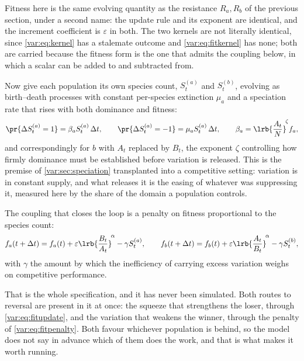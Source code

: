 Fitness here is the same evolving quantity as the resistance $R_a,R_b$ of
the previous section, under a second name: the update rule and its exponent
are identical, and the increment coefficient is $\varepsilon$ in both. The
two kernels are not literally identical, since \cref{var:eq:kernel} has a
stalemate outcome and \cref{var:eq:fitkernel} has none; both are carried
because the fitness form is the one that admits the coupling below, in which
a scalar can be added to and subtracted from.

Now give each population its own species count, $S^{(a)}_t$ and $S^{(b)}_t$,
evolving as birth--death processes with constant per-species extinction
$\mu_a$ and a speciation rate that rises with both dominance and fitness:
\begin{equation}
\pr{\Delta S^{(a)}_t=1}=\beta_a S^{(a)}_t\,\Delta t,
\qquad
\pr{\Delta S^{(a)}_t=-1}=\mu_a S^{(a)}_t\,\Delta t,
\qquad
\beta_a=\lrb{\frac{A_t}{N}}^{\!\zeta}f_a,
\label{var:eq:subspec}
\end{equation}
and correspondingly for $b$ with $A_t$ replaced by $B_t$, the exponent
$\zeta$ controlling how firmly dominance must be established before variation
is released. This is the premise of \cref{var:sec:speciation} transplanted
into a competitive setting: variation is in constant supply, and what
releases it is the easing of whatever was suppressing it, measured here by
the share of the domain a population controls.

The coupling that closes the loop is a penalty on fitness proportional to the
species count:
\begin{equation}
f_a(t+\Delta t)=f_a(t)+\varepsilon\lrb{\frac{B_t}{A_t}}^{\!\alpha}
-\gamma S^{(a)}_t,
\qquad
f_b(t+\Delta t)=f_b(t)+\varepsilon\lrb{\frac{A_t}{B_t}}^{\!\alpha}
-\gamma S^{(b)}_t,
\label{var:eq:fitpenalty}
\end{equation}
with $\gamma$ the amount by which the inefficiency of carrying excess
variation weighs on competitive performance.

That is the whole specification, and it has never been simulated. Both routes
to reversal are present in it at once: the squeeze that strengthens the
loser, through \cref{var:eq:fitupdate}, and the variation that weakens the
winner, through the penalty of \cref{var:eq:fitpenalty}. Both favour whichever
population is behind, so the model does not say in advance which of them does
the work, and that is what makes it worth running.

